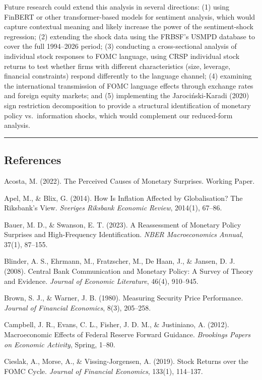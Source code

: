 \documentclass[
]{article}
\begin{document}
Future research could extend this analysis in several directions: (1)
using FinBERT or other transformer-based models for sentiment analysis,
which would capture contextual meaning and likely increase the power of
the sentiment-shock regression; (2) extending the shock data using the
FRBSF's USMPD database to cover the full 1994--2026 period; (3)
conducting a cross-sectional analysis of individual stock responses to
FOMC language, using CRSP individual stock returns to test whether firms
with different characteristics (size, leverage, financial constraints)
respond differently to the language channel; (4) examining the
international transmission of FOMC language effects through exchange
rates and foreign equity markets; and (5) implementing the
Jarociński-Karadi (2020) sign restriction decomposition to provide a
structural identification of monetary policy vs.~information shocks,
which would complement our reduced-form analysis.

\begin{center}\rule{0.5\linewidth}{0.5pt}\end{center}

\subsection{References}\label{references}

Acosta, M. (2022). The Perceived Causes of Monetary Surprises. Working
Paper.

Apel, M., \& Blix, G. (2014). How Is Inflation Affected by
Globalisation? The Riksbank's View. \emph{Sveriges Riksbank Economic
Review}, 2014(1), 67--86.

Bauer, M. D., \& Swanson, E. T. (2023). A Reassessment of Monetary
Policy Surprises and High-Frequency Identification. \emph{NBER
Macroeconomics Annual}, 37(1), 87--155.

Blinder, A. S., Ehrmann, M., Fratzscher, M., De Haan, J., \& Jansen, D.
J. (2008). Central Bank Communication and Monetary Policy: A Survey of
Theory and Evidence. \emph{Journal of Economic Literature}, 46(4),
910--945.

Brown, S. J., \& Warner, J. B. (1980). Measuring Security Price
Performance. \emph{Journal of Financial Economics}, 8(3), 205--258.

Campbell, J. R., Evans, C. L., Fisher, J. D. M., \& Justiniano, A.
(2012). Macroeconomic Effects of Federal Reserve Forward Guidance.
\emph{Brookings Papers on Economic Activity}, Spring, 1--80.

Cieslak, A., Morse, A., \& Vissing-Jorgensen, A. (2019). Stock Returns
over the FOMC Cycle. \emph{Journal of Financial Economics}, 133(1),
114--137.
\end{document}
